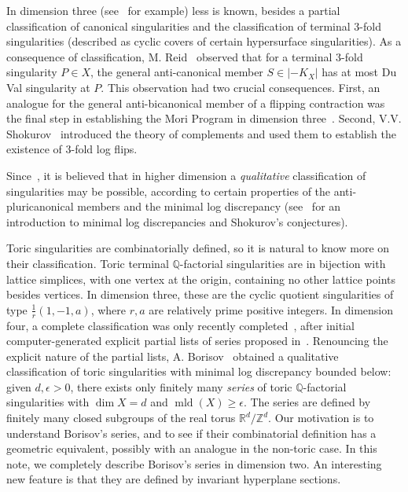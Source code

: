 \documentclass[12pt,reqno]{amsart}
\newcommand{\Q}{{\mathbb Q}}
\newcommand{\Z}{{\mathbb Z}}
\newcommand{\R}{{\mathbb R}}
\newcommand{\mld}{\operatorname{mld}}
\theoremstyle{plain}
\theoremstyle{definition}
\theoremstyle{remark}
\begin{document}
In dimension three (see~\cite{Reid87} for example) less is known, besides 
a partial classification of canonical singularities and the classification of terminal $3$-fold singularities (described as cyclic covers of certain hypersurface singularities). As a consequence of classification, M. Reid~\cite{Reid87} observed that for a terminal $3$-fold singularity $P\in X$, the general anti-canonical member $S\in |-K_X|$ has at most Du Val singularity at $P$. This observation had two crucial consequences.
First, an analogue for the general anti-bicanonical member of a flipping contraction was the final step in establishing the Mori Program in dimension three~\cite{Mori88}. Second, V.V. Shokurov~\cite{Sho92} introduced the theory of complements and used them to establish the existence of $3$-fold log flips.

Since~\cite{Sho92,Sho04}, it is believed that in higher dimension a {\em qualitative} classification of 
singularities may be possible, according to certain properties of the anti-pluricanonical members and the minimal log discrepancy (see~\cite{Am06} for an introduction to minimal log discrepancies and Shokurov's conjectures).

Toric singularities are combinatorially defined, so it is natural to know more on their classification. Toric terminal $\Q$-factorial singularities are in bijection with lattice simplices, with one vertex at the origin, containing
no other lattice points besides vertices. 
In dimension three, these are the cyclic quotient singularities of type $\frac{1}{r}(1,-1,a)$, where $r,a$ are relatively prime positive integers. In dimension four, a complete classification was only recently completed~\cite{IS21}, after initial computer-generated explicit partial lists of series proposed in~\cite{MMS88}. Renouncing the explicit nature of the partial lists, A. Borisov~\cite{Bor99} obtained a qualitative classification of toric singularities with minimal log discrepancy bounded below:
given $d,\epsilon>0$, there exists only finitely many {\em series} of toric 
$\Q$-factorial singularities with $\dim X=d$ and $\mld(X)\ge \epsilon$. The series are defined by finitely many closed subgroups of the real torus $\R^d/\Z^d$.
Our motivation is to understand Borisov's series, and to see if their combinatorial definition has a geometric equivalent, possibly with an analogue in the non-toric case. 
In this note, we completely describe Borisov's series in dimension two. An interesting new feature is that they are defined by invariant hyperplane sections.
\end{document}
